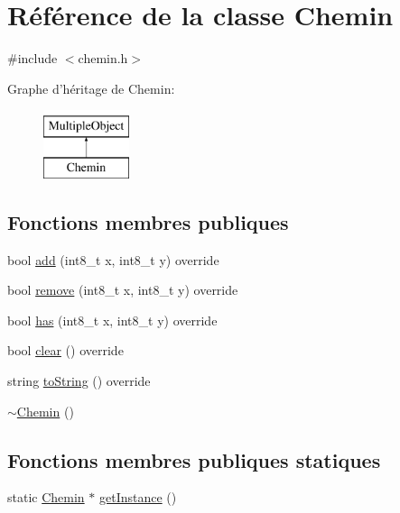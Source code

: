 \hypertarget{classChemin}{\section{Référence de la classe Chemin}
\label{classChemin}
}


{\ttfamily \#include $<$chemin.\-h$>$}

Graphe d'héritage de Chemin\-:\begin{figure}[H]
\begin{center}
\leavevmode
\includegraphics[height=2.000000cm]{classChemin}
\end{center}
\end{figure}
\subsection*{Fonctions membres publiques}
\begin{DoxyCompactItemize}
\item 
bool \hyperlink{classChemin_a2ee7b6a34082453fbdf890a49017aead}{add} (int8\-\_\-t x, int8\-\_\-t y) override
\item 
bool \hyperlink{classChemin_a1ee3f200283c2c401ef0ffd5800d946c}{remove} (int8\-\_\-t x, int8\-\_\-t y) override
\item 
bool \hyperlink{classChemin_aceccf541a2cdde27eb8f4bf541aff1b3}{has} (int8\-\_\-t x, int8\-\_\-t y) override
\item 
bool \hyperlink{classChemin_a67a8418164f0b2a4d1827e393ba859f7}{clear} () override
\item 
string \hyperlink{classChemin_a3b1754233eb79fb9f7d119a42efbda3c}{to\-String} () override
\item 
\hyperlink{classChemin_a0024ec1de3487b44a51c095aca1b83dc}{$\sim$\-Chemin} ()
\end{DoxyCompactItemize}
\subsection*{Fonctions membres publiques statiques}
\begin{DoxyCompactItemize}
\item 
static \hyperlink{classChemin}{Chemin} $\ast$ \hyperlink{classChemin_a82bfca776ad8bd221a5a430526f1d41f}{get\-Instance} ()
\end{DoxyCompactItemize}
